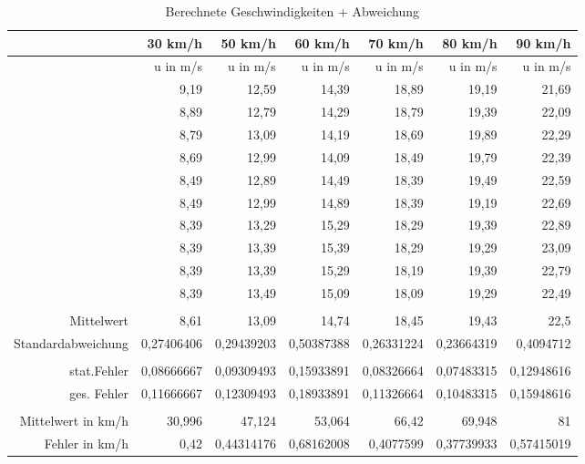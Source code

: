 \begin{table}[htbp]
  \centering
  \caption{Berechnete Geschwindigkeiten + Abweichung}
    \begin{tabular}{rrrrrrr}
    \toprule
          & 30 km/h & 50 km/h & 60 km/h & 70 km/h & 80 km/h & 90 km/h \\
    \midrule
          & u in m/s & u in m/s & u in m/s & u in m/s & u in m/s & u in m/s \\
          & 9,19  & 12,59 & 14,39 & 18,89 & 19,19 & 21,69 \\
          & 8,89  & 12,79 & 14,29 & 18,79 & 19,39 & 22,09 \\
          & 8,79  & 13,09 & 14,19 & 18,69 & 19,89 & 22,29 \\
          & 8,69  & 12,99 & 14,09 & 18,49 & 19,79 & 22,39 \\
          & 8,49  & 12,89 & 14,49 & 18,39 & 19,49 & 22,59 \\
          & 8,49  & 12,99 & 14,89 & 18,39 & 19,19 & 22,69 \\
          & 8,39  & 13,29 & 15,29 & 18,29 & 19,39 & 22,89 \\
          & 8,39  & 13,39 & 15,39 & 18,29 & 19,29 & 23,09 \\
          & 8,39  & 13,39 & 15,29 & 18,19 & 19,39 & 22,79 \\
          & 8,39  & 13,49 & 15,09 & 18,09 & 19,29 & 22,49 \\
          &       &       &       &       &       &  \\
    Mittelwert & 8,61  & 13,09 & 14,74 & 18,45 & 19,43 & 22,5 \\
    Standardabweichung & 0,27406406 & 0,29439203 & 0,50387388 & 0,26331224 & 0,23664319 & 0,4094712 \\
          &       &       &       &       &       &  \\
    stat.Fehler & 0,08666667 & 0,09309493 & 0,15933891 & 0,08326664 & 0,07483315 & 0,12948616 \\
    ges. Fehler & 0,11666667 & 0,12309493 & 0,18933891 & 0,11326664 & 0,10483315 & 0,15948616 \\
          &       &       &       &       &       &  \\
    Mittelwert in km/h & 30,996 & 47,124 & 53,064 & 66,42 & 69,948 & 81 \\
    Fehler in km/h & 0,42  & 0,44314176 & 0,68162008 & 0,4077599 & 0,37739933 & 0,57415019 \\
    \bottomrule
    \end{tabular}%
  \label{tab:Geschwindigkeiten}%
\end{table}%



